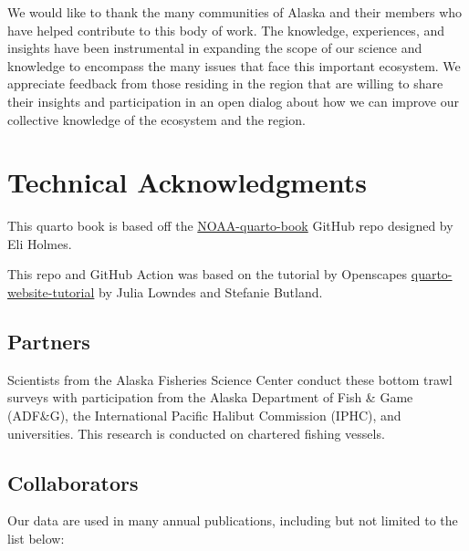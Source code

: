 \documentclass[
  letterpaper,
  oneside,
  open=any]{scrbook}
\begin{document}
We would like to thank the many communities of Alaska and their members
who have helped contribute to this body of work. The knowledge,
experiences, and insights have been instrumental in expanding the scope
of our science and knowledge to encompass the many issues that face this
important ecosystem. We appreciate feedback from those residing in the
region that are willing to share their insights and participation in an
open dialog about how we can improve our collective knowledge of the
ecosystem and the region.

\hypertarget{technical-acknowledgments}{%
\chapter{Technical Acknowledgments}\label{technical-acknowledgments}}

This quarto book is based off the
\href{https://github.com/nmfs-opensci/NOAA-quarto-book}{NOAA-quarto-book}
GitHub repo designed by Eli Holmes.

This repo and GitHub Action was based on the tutorial by Openscapes
\href{https://github.com/Openscapes/quarto-website-tutorial}{quarto-website-tutorial}
by Julia Lowndes and Stefanie Butland.

\hypertarget{partners}{%
\section{Partners}\label{partners}}

Scientists from the Alaska Fisheries Science Center conduct these bottom
trawl surveys with participation from the Alaska Department of Fish \&
Game (ADF\&G), the International Pacific Halibut Commission (IPHC), and
universities. This research is conducted on chartered fishing vessels.

\hypertarget{collaborators}{%
\section{Collaborators}\label{collaborators}}

Our data are used in many annual publications, including but not limited
to the list below:
\end{document}
